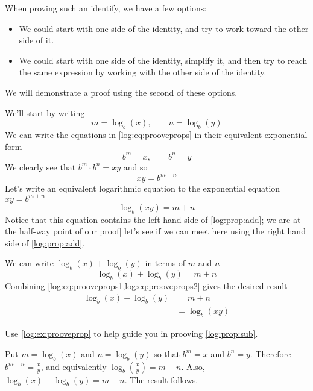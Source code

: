 \begin{pccexample}[Proving that $\log_b(xy)=\log_b(x)+\log_b(y)$]\label{log:ex:prooveprop}
	When proving such an identify, we have a 
	few options:
	\begin{itemize}
		\item We could start with one side of the identity, and try to work
		toward the other side of it.
		\item We could start with one side of the identity, simplify it, and 
		then try to reach the same expression by working with the other side of 
		the identity.
	\end{itemize}
	We will demonstrate a proof using the second of these options.
	\begin{pccsolution}
		We'll start by writing
		\begin{equation}\label{log:eq:prooveprops}
			m=\log_b(x), \qquad n=\log_b(y)
		\end{equation}
		We can write the equations in \cref{log:eq:prooveprops} in their equivalent
		exponential form
		\[
			b^m=x, \qquad b^n=y 
		\]
		We clearly see that $b^m\cdot b^n= xy$ and so
		\[
			xy=b^{m+n}
		\]
		Let's write an equivalent logarithmic equation to the exponential equation $xy=b^{m+n}$
		\begin{equation}\label{log:eq:prooveprops1}
			\log_b(xy)=m+n
		\end{equation}
		Notice that this equation contains the left hand side of \cref{log:prop:add}; we 
		are at the half-way point of our proof| let's see if we can meet here using the right hand side 
		of \cref{log:prop:add}. 
		
		We can write $\log_b(x)+\log_b(y)$ in terms of $m$ and $n$
		\begin{equation}\label{log:eq:prooveprops2}
			\log_b(x)+\log_b(y)=m+n 
		\end{equation}
		Combining \cref{log:eq:prooveprops1,log:eq:prooveprops2} gives
		the desired result
		\begin{align*}
			\log_b(x)+\log_b(y) & =m+n         \\
			                    & = \log_b(xy) 
		\end{align*}
	\end{pccsolution}
\end{pccexample}
\begin{doyouunderstand}
	\begin{problem}
	Use \cref{log:ex:prooveprop} to help guide you in prooving \cref{log:prop:sub}.
	\begin{shortsolution}
		Put $m=\log_b(x)$ and $n=\log_b(y)$ so that $b^m=x$ and $b^n=y$. Therefore
		$b^{m-n}=\frac{x}{y}$, and equivalently $\log_b\left( \frac{x}{y} \right)=m-n$. 
		Also, $\log_b(x)-\log_b(y)=m-n$. The result follows.
	\end{shortsolution}
	\end{problem}
\end{doyouunderstand}

